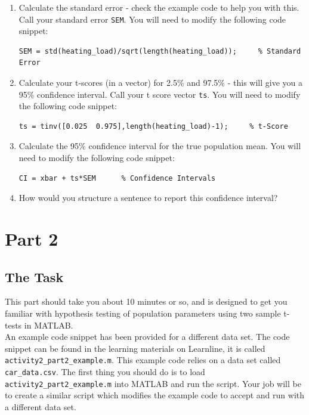\documentclass[12pt]{article}
\begin{document}
\begin{enumerate}
\item Calculate the standard error - check the example code to help you with this. Call your standard error \verb|SEM|. You will need to modify the following code snippet:
\vspace{-0.4cm}
\begin{lstlisting}
SEM = std(heating_load)/sqrt(length(heating_load));     % Standard Error
\end{lstlisting}

\item Calculate your t-scores (in a vector) for 2.5\% and 97.5\% - this will give you a 95\% confidence interval. Call your t score vector \verb|ts|. You will need to modify the following code snippet:
\vspace{-0.4cm}
\begin{lstlisting}
ts = tinv([0.025  0.975],length(heating_load)-1);     % t-Score
\end{lstlisting}

\item Calculate the 95\% confidence interval for the true population mean. You will need to modify the following code snippet:
\vspace{-0.4cm}
\begin{lstlisting}
CI = xbar + ts*SEM      % Confidence Intervals
\end{lstlisting}

\item How would you structure a sentence to report this confidence interval?
\end{enumerate}

\newpage

\section*{Part 2}
\subsection*{The Task}
This part should take you about 10 minutes or so, and is designed to get you familiar with hypothesis testing of population parameters using two sample t-tests in MATLAB.\\

An example code snippet has been provided for a different data set. The code snippet can be found in the learning materials on Learnline, it is called \verb|activity2_part2_example.m|. This example code relies on a data set called \verb|car_data.csv|. The first thing you should do is to load \verb|activity2_part2_example.m| into MATLAB and run the script. Your job will be to create a similar script which modifies the example code to accept and run with a different data set.
\end{document}
